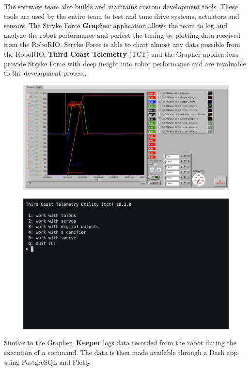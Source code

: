 \documentclass[10pt,tumble]{leaflet}
\begin{document}
The software team also builds and maintains custom development tools.  These tools are used by the entire team to test and tune drive systems, actuators and sensors. The Stryke Force \textbf{Grapher} application allows the team to log and analyze the robot performance and perfect the tuning by plotting data received from the RoboRIO.  Stryke Force is able to chart almost any data possible from the RoboRIO.  \textbf{Third Coast Telemetry} (TCT) and the Grapher applications provide Stryke Force with deep insight into robot performance and are invaluable to the development process.

\begin{figure}[H]
	\centering
	\includegraphics[scale=0.2]{assets/grapher}
\end{figure}

\begin{figure}[H]
	\centering
	\includegraphics[scale=0.35]{assets/tct}
\end{figure}

Similar to the Grapher, \textbf{Keeper} logs data recorded from the robot during the execution of a command. The data is then made available through a Dash app using PostgreSQL and Plotly.
\end{document}
